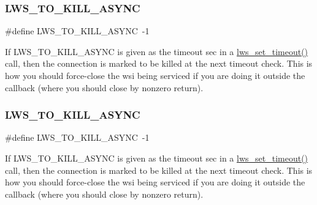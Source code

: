 \subsubsection{\texorpdfstring{L\+W\+S\+\_\+\+T\+O\+\_\+\+K\+I\+L\+L\+\_\+\+A\+S\+Y\+NC}{LWS\_TO\_KILL\_ASYNC}\hspace{0.1cm}{\footnotesize\ttfamily [4/6]}}
{\footnotesize\ttfamily \#define L\+W\+S\+\_\+\+T\+O\+\_\+\+K\+I\+L\+L\+\_\+\+A\+S\+Y\+NC~-\/1}

If L\+W\+S\+\_\+\+T\+O\+\_\+\+K\+I\+L\+L\+\_\+\+A\+S\+Y\+NC is given as the timeout sec in a \hyperlink{group__timeout_gaced9f9237f6172fed9f730a2af51345a}{lws\+\_\+set\+\_\+timeout()} call, then the connection is marked to be killed at the next timeout check. This is how you should force-\/close the wsi being serviced if you are doing it outside the callback (where you should close by nonzero return). \mbox{\label{group__timeout_ga6a53a9a771c08417ffe75c953b58f015}} 
\subsubsection{\texorpdfstring{L\+W\+S\+\_\+\+T\+O\+\_\+\+K\+I\+L\+L\+\_\+\+A\+S\+Y\+NC}{LWS\_TO\_KILL\_ASYNC}\hspace{0.1cm}{\footnotesize\ttfamily [5/6]}}
{\footnotesize\ttfamily \#define L\+W\+S\+\_\+\+T\+O\+\_\+\+K\+I\+L\+L\+\_\+\+A\+S\+Y\+NC~-\/1}

If L\+W\+S\+\_\+\+T\+O\+\_\+\+K\+I\+L\+L\+\_\+\+A\+S\+Y\+NC is given as the timeout sec in a \hyperlink{group__timeout_gaced9f9237f6172fed9f730a2af51345a}{lws\+\_\+set\+\_\+timeout()} call, then the connection is marked to be killed at the next timeout check. This is how you should force-\/close the wsi being serviced if you are doing it outside the callback (where you should close by nonzero return). \mbox{\label{group__timeout_ga6a53a9a771c08417ffe75c953b58f015}} 
